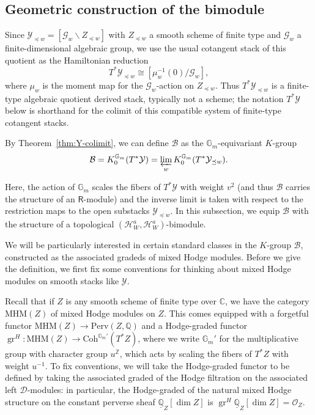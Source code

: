 \documentclass{amsart}
\newcommand{\Hecke}{\mathcal{H}}
\newcommand{\Ring}{\mathsf{R}}
\newcommand{\gr}{\operatorname{gr}}
\newcommand{\B}{\mathcal{B}}
\newcommand{\mhm}{\mathrm{MHM}}
\newcommand{\mc}[1]{\mathcal{#1}}
\theoremstyle{definition}
\numberwithin{equation}{section}
\begin{document}
\subsection{Geometric construction of the bimodule}
Since $\mathcal{Y}_{\preceq w}=[\mathcal G_w\backslash Z_{\preceq w}]$
with $Z_{\preceq w}$ a smooth scheme of finite type and $\mathcal G_w$ a
finite-dimensional algebraic group, we use the usual cotangent stack of this
quotient as the Hamiltonian reduction
\begin{equation}\label{eq:truncated_cotangent}
T^*\mathcal{Y}_{\preceq w}\cong [\mu_w^{-1}(0)/\mathcal G_w],
\end{equation}
where $\mu_w$ is the moment map for the
$\mathcal G_w$-action on $Z_{\preceq w}$. Thus $T^*\mathcal{Y}_{\preceq w}$ is a finite-type
algebraic quotient { derived } stack, typically not a scheme; the notation $T^*\mathcal Y$
below is shorthand for the colimit of this compatible system of finite-type cotangent stacks.

By Theorem~\ref{thm:Y-colimit}, we can define $\mathcal{B}$ as the $\mathbb{G}_m$-equivariant $K$-group
\begin{equation}\label{eqn:bdef}
    \mathcal{B} = K_0^{\mathbb{G}_m}(T^*\mathcal{Y}) = \varprojlim_{w} K_0^{\mathbb{G}_m}(T^*\mathcal{Y}_{\preceq w}).
\end{equation}

Here, the action of $\mathbb{G}_m$ scales the fibers of $T^*\mathcal{Y}$ with weight $v^2$ (and thus $\mathcal{B}$ carries the structure of an $\Ring$-module) and the inverse limit is taken with respect to the restriction maps to the open substacks $\mathcal{Y}_{\preceq w}$. In this subsection, we equip $\mathcal{B}$ with the structure of a topological $(\Hecke_W^a, \Hecke_W^a)$-bimodule.
%

We will be particularly interested in certain standard classes in the $K$-group $\B$, constructed as the associated gradeds of mixed Hodge modules. Before we give the definition, we first fix some conventions for thinking about mixed Hodge modules on smooth stacks like $\mc{Y}$.

Recall that if $Z$ is any smooth scheme of finite type over $\mathbb{C}$, we have the category $\mhm(Z)$ of mixed Hodge modules on $Z$. This comes equipped with a forgetful functor $\mhm(Z) \to \mathrm{Perv}(Z, \mathbb{Q})$ and a Hodge-graded functor $\gr^H : \mhm(Z) \to \mathrm{Coh}^{\mathbb{G}_m'}(T^*Z)$, where we write $\mathbb{G}_m'$ for the multiplicative group with character group $u^{\mathbb{Z}}$, which acts by scaling the fibers of $T^*Z$ with weight $u^{-1}$. To fix conventions, we will take the Hodge-graded functor to be defined by taking the associated graded of the Hodge filtration on the associated left $\mathcal{D}$-modules: in particular, the Hodge-graded of the natural mixed Hodge structure on the constant perverse sheaf $\underline{\mathbb{Q}}_Z[\dim Z]$ is $\gr^H\underline{\mathbb{Q}}_Z[\dim Z] = \mathcal{O}_Z$.
\end{document}
